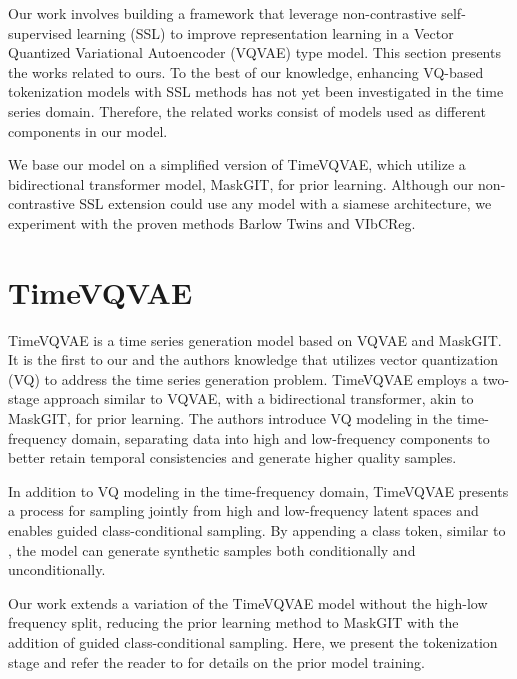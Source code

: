 \documentclass[../../thesis.tex]{subfiles}
\begin{document}
Our work involves building a framework that leverage non-contrastive self-supervised learning (SSL) to improve representation learning in a Vector Quantized Variational Autoencoder (VQVAE) type model. This section presents the works related to ours. To the best of our knowledge, enhancing VQ-based tokenization models with SSL methods has not yet been investigated in the time series domain. Therefore, the related works consist of models used as different components in our model.\newline

We base our model on a simplified version of TimeVQVAE, which utilize a bidirectional transformer model, MaskGIT, for prior learning. Although our non-contrastive SSL extension could use any model with a siamese architecture, we experiment with the proven methods Barlow Twins and VIbCReg.

\section{TimeVQVAE}

TimeVQVAE is a time series generation model based on VQVAE and MaskGIT. It is the first to our and the authors knowledge that utilizes vector quantization (VQ) to address the time series generation problem. TimeVQVAE employs a two-stage approach similar to VQVAE, with a bidirectional transformer, akin to MaskGIT, for prior learning. The authors introduce VQ modeling in the time-frequency domain, separating data into high and low-frequency components to better retain temporal consistencies and generate higher quality samples.\newline

In addition to VQ modeling in the time-frequency domain, TimeVQVAE presents a process for sampling jointly from high and low-frequency latent spaces and enables guided class-conditional sampling. By appending a class token, similar to \cite{dosovitskiy2021image}, the model can generate synthetic samples both conditionally and unconditionally.\newline

Our work extends a variation of the TimeVQVAE model without the high-low frequency split, reducing the prior learning method to MaskGIT with the addition of guided class-conditional sampling. Here, we present the tokenization stage and refer the reader to \cite{VQVAE} for details on the prior model training.
\end{document}
